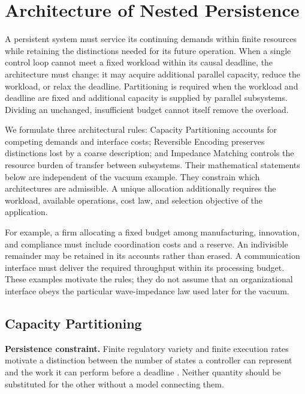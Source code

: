 \section{Architecture of Nested Persistence}
\label{sec:nested_persistence}

A persistent system must service its continuing demands within finite resources while retaining the distinctions needed for its future operation. When a single control loop cannot meet a fixed workload within its causal deadline, the architecture must change: it may acquire additional parallel capacity, reduce the workload, or relax the deadline. Partitioning is required when the workload and deadline are fixed and additional capacity is supplied by parallel subsystems. Dividing an unchanged, insufficient budget cannot itself remove the overload.

We formulate three architectural rules: Capacity Partitioning accounts for competing demands and interface costs; Reversible Encoding preserves distinctions lost by a coarse description; and Impedance Matching controls the resource burden of transfer between subsystems. Their mathematical statements below are independent of the vacuum example. They constrain which architectures are admissible. A unique allocation additionally requires the workload, available operations, cost law, and selection objective of the application.

For example, a firm allocating a fixed budget among manufacturing, innovation, and compliance must include coordination costs and a reserve. An indivisible remainder may be retained in its accounts rather than erased. A communication interface must deliver the required throughput within its processing budget. These examples motivate the rules; they do not assume that an organizational interface obeys the particular wave-impedance law used later for the vacuum.

\subsection{Capacity Partitioning}
\label{rule_capacity_partitioning}

\textbf{Persistence constraint.} Finite regulatory variety and finite execution rates motivate a distinction between the number of states a controller can represent and the work it can perform before a deadline \cite{raadt_ashbys_1987,margolus_maximum_1998}. Neither quantity should be substituted for the other without a model connecting them.

